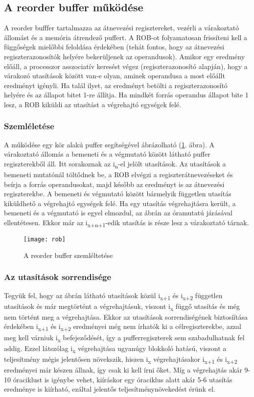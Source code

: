 \subsection{A reorder buffer működése}
A reorder bufffer tartalmazza az átnevezési regisztereket, vezérli a várakoztató állomást és a memória átrendező puffert.
A ROB-ot folyamatosan frissíteni kell a függőségek mielőbbi feloldása érdekében (tehát fontos, hogy az átnevezési regiszterazonosítók helyére bekerüljenek az operandusok).
Amikor egy eredmény előáll, a processzor asszociatív keresést végez (regiszterazonosító alapján), hogy a várakozó utasítások között van-e olyan, aminek operandusa a most előállt eredményt igényli.
Ha talál ilyet, az eredményt betölti a regiszterazonosító helyére és az állapot bitet 1-re állítja.
Ha mindkét forrás operandus állapot bite 1 lesz, a ROB kiküldi az utasítást a végrehajtó egységek felé.
\subsubsection{Szemléletése}
A működése egy kör alakú puffer segítségével ábrázolható (\ref{fig:rob}. ábra).
A várakoztató állomás a bemeneti és a végmutató között látható puffer regiszterekből áll.
Itt sorakoznak az i\textsubscript{n}-el jelölt utasítások.
Az utasítások a bemeneti mutatónál töltődnek be, a ROB elvégzi a regiszterátnevezéseket és beírja a forrás operandusokat, majd később az eredményt is az átnevezési regiszterekbe.
A bemeneti és végmutató között bármelyik független utasítás kiküldhető a végrehajtó egységek felé.
Ha egy utasítás végrehajtásra került, a bemeneti és a végmutató is egyel elmozdul, az ábrán az óramutatú járásával ellentétesen.
Ekkor már az i\textsubscript{x+n+1}-edik utasítás is része lesz a várakoztató tárnak.
\begin{figure}[h]
    \texttt{[image: rob]}
    \centering
    \caption{A reorder buffer szemléltetése}
    \label{fig:rob}
\end{figure}
\subsubsection{Az utasítások sorrendisége}
Tegyük fel, hogy az ábrán látható utasítások közül i\textsubscript{x+1} és i\textsubscript{x+2} független utasítások és már megtörtént a végrehajtásuk, viszont i\textsubscript{x} függő utasítás és még nem történt meg a végrehajtása.
Ekkor az utasítások sorrendiségének biztosíítása érdekében i\textsubscript{x+1} és i\textsubscript{x+2} eredményei még nem írhatók ki a célregiszterekbe, azzal meg kell várniuk i\textsubscript{x} befejeződését, így a pufferregiszterek sem szabadulhatnak fel addig.
Ezzel látszólag i\textsubscript{x} végrehajtása ugyanúgy blokkoló hatású, viszont a teljesítmény mégis jelentősen növekszik, hiszen i\textsubscript{x} végrehajtásakor i\textsubscript{x+1} és i\textsubscript{x+2} eredményei már készen állnak, így csak ki kell írni őket.
Míg a végrehajtás akár 9-10 óraciklust is igénybe vehet, kiíráskor egy óraciklus alatt akár 5-6 utasítás eredménye is kiírható, ezáltal jelentős teljesítménynövekedést érünk el.
